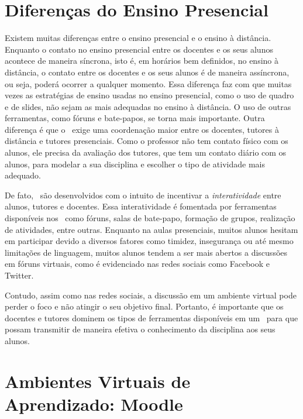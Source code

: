
\section{Diferen{\c c}as do Ensino Presencial}  Existem muitas diferen{\c c}as entre o ensino presencial e 
o ensino {\` a} dist{\^ a}ncia. Enquanto o contato no ensino presencial entre os docentes e os seus alunos acontece de maneira s{\' i}ncrona, 
isto {\' e}, em hor{\' a}rios bem definidos, no ensino {\` a} dist{\^ a}ncia, o contato entre os docentes e os seus alunos {\' e} de maneira
ass{\' i}ncrona, ou seja, poder{\' a} ocorrer a qualquer momento. Essa diferen{\c c}a faz com que muitas vezes as estrat{\' e}gias de ensino usadas no ensino 
presencial, como o uso de quadro e de slides, n{\~ a}o sejam as mais adequadas no ensino {\` a} dist{\^ a}ncia. O uso de outras ferramentas, 
como f{\' o}runs e bate-papos, se torna mais importante. Outra diferen{\c c}a {\' e} que o \ead\ exige uma coordena{\c c}{\~ a}o maior entre os docentes, tutores
{\` a} dist{\^ a}ncia e tutores presenciais. Como o professor n{\~ a}o tem contato f{\' i}sico com os alunos, ele precisa da avalia{\c c}{\~ a}o dos tutores, 
que tem um contato di{\' a}rio com os alunos, para modelar a sua disciplina e escolher o tipo de atividade mais adequado.

De fato, \avas\ s{\~ a}o desenvolvidos com o intuito de incentivar 
a \emph{interatividade} entre alunos, tutores e docentes. Essa interatividade {\' e} fomentada por ferramentas 
dispon{\' i}veis nos \avas\ como f{\' o}runs, salas de bate-papo, forma{\c c}{\~ a}o de grupos, realiza{\c c}{\~ a}o de atividades, entre outras. 
Enquanto na aulas presenciais, muitos alunos hesitam em participar devido a diversos fatores como timidez, inseguran{\c c}a ou 
at{\' e} mesmo limita{\c c}{\~ o}es de linguagem, muitos alunos tendem a ser mais abertos a discuss{\~ o}es em 
f{\' o}runs virtuais, como {\' e} evidenciado nas redes sociais como Facebook e Twitter. 

Contudo, assim como nas redes sociais, a discuss{\~ a}o em um ambiente virtual pode perder o foco e n{\~ a}o atingir 
o seu objetivo final. Portanto, {\' e} importante que os docentes e tutores dominem os tipos de ferramentas dispon{\' i}veis 
em um \ava\ para que possam transmitir de maneira efetiva o conhecimento da disciplina aos seus alunos.


\section{Ambientes Virtuais de Aprendizado: Moodle}
\label{subsec:cap1:Moodle}

